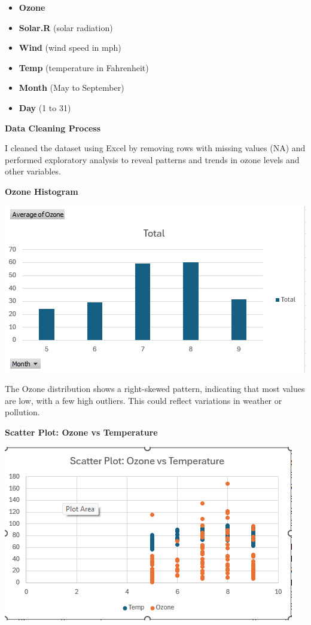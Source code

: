 \documentclass[
  letterpaper,
  DIV=11,
  numbers=noendperiod]{scrreprt}
\providecommand{\tightlist}{%
  \setlength{\itemsep}{0pt}\setlength{\parskip}{0pt}}\usepackage{longtable,booktabs,array}
\begin{document}
\begin{itemize}
\tightlist
\item
  \textbf{Ozone}
\item
  \textbf{Solar.R} (solar radiation)
\item
  \textbf{Wind} (wind speed in mph)
\item
  \textbf{Temp} (temperature in Fahrenheit)
\item
  \textbf{Month} (May to September)
\item
  \textbf{Day} (1 to 31)
\end{itemize}

\textbf{Data Cleaning Process}

I cleaned the dataset using Excel by removing rows with missing values
(NA) and performed exploratory analysis to reveal patterns and trends in
ozone levels and other variables.

\textbf{Ozone Histogram}

\includegraphics{hist_ozone_toluwanimi.png}

The Ozone distribution shows a right-skewed pattern, indicating that
most values are low, with a few high outliers. This could reflect
variations in weather or pollution.

\textbf{Scatter Plot: Ozone vs Temperature}

\includegraphics{scatter_ozone_vs_temp_toluwanimi.png}
\end{document}
